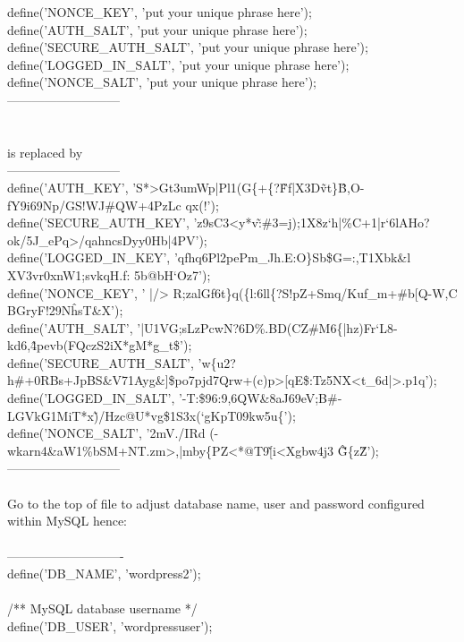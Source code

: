 \documentclass[10pt,a4paper]{article}
\begin{document}
{{{{{{{{{{{{{{{{define('NONCE\_KEY',        'put your unique phrase here');\\
define('AUTH\_SALT',        'put your unique phrase here');\\
define('SECURE\_AUTH\_SALT', 'put your unique phrase here');\\
define('LOGGED\_IN\_SALT',   'put your unique phrase here');\\
define('NONCE\_SALT',       'put your unique phrase here');\\
---------------------------\\
\\
\\
is replaced by\\
---------------------------\\
define('AUTH\_KEY',         'S*>Gt3umWp|Pl1(G\{+\{?\~Ff|X3D\~vt\}\^B,O-fY9i69Np/GS!WJ\#QW+4PzLc qx(!');\\
define('SECURE\_AUTH\_KEY',  'z9sC3<y*v\~:\#3=j);1X8z`h|\%C+1|r`6lAHo?ok/5J\_ePq>/qahncsDyy0Hb|4PV');\\
define('LOGGED\_IN\_KEY',    'qfhq6Pl2pePm\_Jh.E:O\}Sb\$G=:,T1Xbk\&l XV3vr0xnW1;svkqH.f: 5b@bH`Oz7');\\
define('NONCE\_KEY',        ' |/> R;zalGf6t\}q(\{l:6ll\{?S!pZ+Smq/Kuf\_m+\#b[Q-W,C BGryF!29N\^hsT\&X');\\
define('AUTH\_SALT',        '|U1VG;sLzPcwN?6D\%.BD(CZ\#M6\{|hz)Fr`L8-kd6,\^4pevb(FQczS2iX*gM*g\_t\$');\\
define('SECURE\_AUTH\_SALT', 'w\{u2?h\#+0RBs+JpBS\&V71Ayg\&]\$po7pjd7Qrw+(c)p>[qE\$:Tz5NX<t\_6d|>.p1q');\\
define('LOGGED\_IN\_SALT',   '-T:\$96:9,6QW\&8aJ69eV;B\#-LGVkG1MiT*x\~)/Hzc@U*vg\$1S3x(`gKpT09kw5u\{');\\
define('NONCE\_SALT',       '2mV./IRd (-wkarn4\&aW1\%bSM+NT.zm>,|mby\{PZ<*@T9\~[i<Xgbw4j3 \~\^G\{z\^Z');\\
---------------------------\\
\\
Go to the top of file to adjust database name, user and password configured within MySQL hence:\\
\\
----------------------------\\
define('DB\_NAME', 'wordpress2');\\
\\
/** MySQL database username */\\
define('DB\_USER', 'wordpressuser');\\
\\
}}}}}}}}}}}}}}}}
\end{document}
